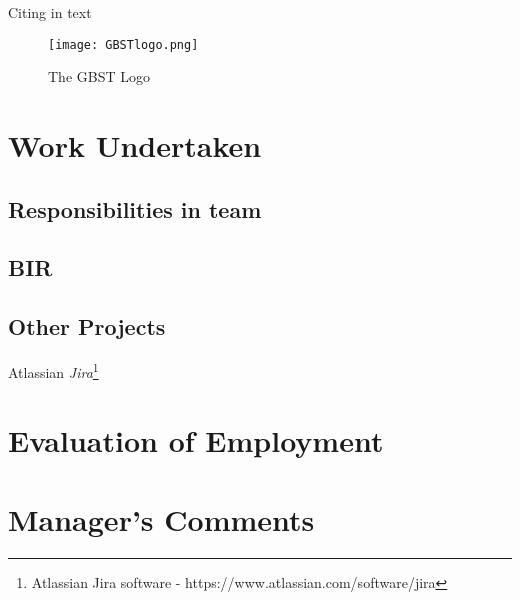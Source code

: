 \documentclass[a4paper]{report}
\begin{document}
Citing \cite{gbstlogo} in text

\vspace{0.5cm}
\begin{figure}[ht!]
\centering
\texttt{[image: GBSTlogo.png]}
\caption{The GBST Logo}
\label{gbstlogo}
\end{figure}

\begin{comment}
\begin{flushright}
\texttt{[image: GBSTlogo.png]}
\end{flushright}
\end{comment}


\chapter{Work Undertaken}

\section{Responsibilities in team}

\section{BIR}

\section{Other Projects}

Atlassian \textit{Jira}\footnote{Atlassian Jira software - https://www.atlassian.com/software/jira}


\chapter{Evaluation of Employment}

\newpage

\chapter{Manager's Comments}
\end{document}
